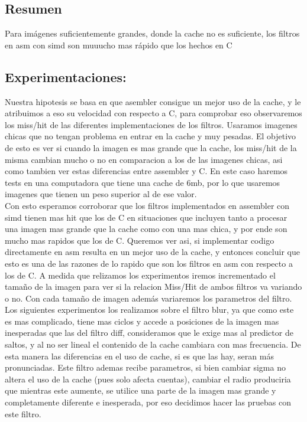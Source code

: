 \subsection{Resumen}

Para imágenes suficientemente grandes, donde la cache no es suficiente, los filtros en asm con simd son muuucho mas rápido que los hechos en C

\subsection{Experimentaciones:}

Nuestra hipotesis se basa en que asembler consigue un mejor uso de la cache, y le atribuimos a eso su velocidad con respecto a C, para comprobar eso observaremos los miss/hit de las diferentes implementaciones de los filtros. Usaramos imagenes chicas que no tengan problema en entrar en la cache y muy pesadas. El objetivo de esto es ver si cuando la imagen es mas grande que la cache, los miss/hit de la misma cambian mucho o no en comparacion a los de las imagenes chicas, asi como tambien ver estas diferencias entre assembler y C. En este caso haremos tests en una computadora que tiene una cache de 6mb, por lo que usaremos imagenes que tienen un peso superior al de ese valor. \\


Con esto esperamos corroborar que los filtros implementados en assembler con simd tienen mas hit que los de C en situaciones que incluyen tanto a procesar una imagen mas grande que la cache como con una mas chica, y por ende son mucho mas rapidos que los de C. Queremos ver asi, si implementar codigo directamente en asm resulta en un mejor uso de la cache, y entonces concluir que esto es una de las razones de lo rapido que son los filtros en asm con respecto a los de C. A medida que relizamos los experimentos iremos incrementado el tamaño de la imagen para ver si la relacion Miss/Hit de ambos filtros va variando o no. Con cada tamaño de imagen además variaremos los parametros del filtro. \\


Los siguientes experimentos los realizamos sobre el filtro blur, ya que como este es mas complicado, tiene mas ciclos y accede a posiciones de la imagen mas inesperadas que las del filtro diff, consideramos que le exige mas al predictor de saltos, y al no ser lineal el contenido de la cache cambiara con mas frecuencia. De esta manera las diferencias en el uso de cache, si es que las hay, seran más pronunciadas. Este filtro ademas recibe parametros, si bien cambiar sigma no altera el uso de la cache (pues solo afecta cuentas), cambiar el radio produciria que mientras este aumente, se utilice una parte de la imagen mas grande y completamente diferente e inesperada, por eso decidimos hacer las pruebas con este filtro. \\


